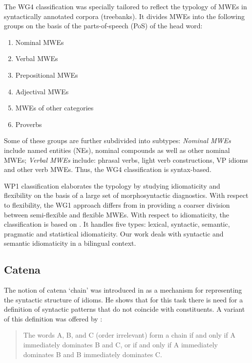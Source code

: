 \documentclass[output=paper]{langsci/langscibook}
\begin{document}
The WG4 classification was specially tailored to reflect the typology of
MWEs in syntactically annotated corpora (treebanks). It divides MWEs into
the following groups on the basis of the parts-of-speech (PoS) of the head
word:

\begin{enumerate}
\item Nominal MWEs
\item Verbal MWEs
\item Prepositional MWEs
\item Adjectival MWEs
\item MWEs of other categories
\item Proverbs
\end{enumerate}

Some of these groups are further subdivided into subtypes: {\em Nominal
MWEs} include named entities (NEs), nominal compounds as well as other
nominal MWEs; {\em Verbal MWEs} include: phrasal verbs, light verb
constructions, VP idioms and other verb MWEs. Thus, the WG4 classification
is syntax-based.

WP1 classification elaborates the typology by studying  idiomaticity and
flexibility on the basis of a large set of morphosyntactic diagnostics. With
respect to flexibility, the WG1 approach differs from \citet{Sag:2002} in
providing a coarser division between semi-flexible and flexible MWEs. With
respect to idiomaticity, the classification is based on
\citet{Baldwin2010}. It handles five types: lexical, syntactic, semantic,
pragmatic and statistical idiomaticity. Our work deals with syntactic and
semantic idiomaticity in a bilingual context.

\subsection{Catena}

The notion of catena `chain' was introduced in \citet[284]{OGrady:98} as a
mechanism for representing the syntactic structure of idioms. He shows that
for this task there is need for a definition of syntactic patterns that do
not coincide with constituents. A variant of this definition was offered by \citet{Osborne2006}:
\begin{quotation}
The words A, B, and C (order irrelevant)
form a chain if and only if A immediately dominates B and C, or if and only
if A immediately dominates B and B immediately dominates C. \citep[258]{Osborne2006}
\end{quotation}
\end{document}
